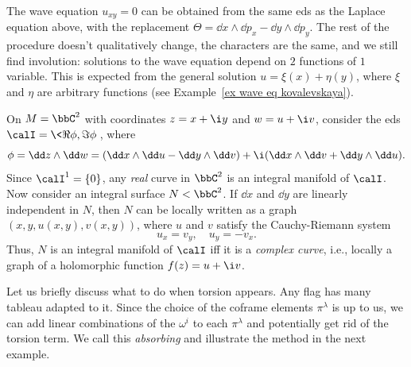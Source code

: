 \begin{example}
    The wave equation $u_{xy}=0$ can be obtained from the same \gls{eds} as the Laplace equation above, with the replacement $\Theta=\dd x\wedge\dd p_x-\dd y\wedge\dd p_y$. The rest of the procedure doesn't qualitatively change, the characters are the same, and we still find involution: solutions to the wave equation depend on $2$ functions of $1$ variable. This is expected from the general solution $u=\xi(x)+\eta(y)$, where $\xi$ and $\eta$ are arbitrary functions (see Example~\ref{ex wave eq kovalevskaya}).
\end{example}

\begin{example}
    On $M=\bbC^2$ with coordinates $z=x+\i y$ and $w=u+\i v$, consider the \gls{eds} $\calI=\<\Re \phi,\Im \phi\>$, where 
    \[\phi =\dd z\wedge \dd w=(\dd x\wedge \dd u-\dd y\wedge\dd v)+\i (\dd x\wedge\dd v+\dd y\wedge \dd u).\]
    Since $\calI^1=\{0\}$, any \emph{real} curve in $\bbC^2$ is an integral manifold of $\calI$. Now consider an integral surface $N<\bbC^2$. If $\dd x$ and $\dd y$ are linearly independent in $N$, then $N$ can be locally written as a graph $(x,y,u(x,y),v(x,y))$, where $u$ and $v$ satisfy the Cauchy-Riemann system
    \[u_x=v_y,\quad u_y=-v_x.\]
    Thus, $N$ is an integral manifold of $\calI$ iff it is a \emph{complex curve}, i.e., locally a graph of a holomorphic function $f(z)=u+\i v$.
\end{example}


Let us briefly discuss what to do when torsion appears.
Any flag has many tableau adapted to it. Since the choice of the coframe elements $\pi^\lambda$ is up to us, we can add linear combinations of the $\omega^i$ to each $\pi^\lambda$ and potentially get rid of the torsion term. We call this \emph{absorbing} and illustrate the method in the next example.



